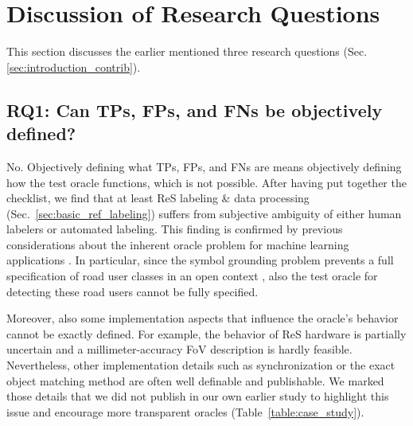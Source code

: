\documentclass[conference]{IEEEtran}
\begin{document}


\section{Discussion of Research Questions}
\label{sec:discussion}


This section discusses the earlier mentioned three research questions (Sec. \ref{sec:introduction_contrib}). 


\subsection{RQ1: Can TPs, FPs, and FNs be objectively defined?}
\label{sec:discussion_rq1}

No. Objectively defining what TPs, FPs, and FNs are means objectively defining how the test oracle functions, which is not possible. After having put together the checklist, we find that at least ReS labeling \& data processing (Sec.~\ref{sec:basic_ref_labeling}) suffers from subjective ambiguity of either human labelers or automated labeling. 
This finding is confirmed by previous considerations about the inherent oracle problem for machine learning applications \cite{Abrecht2021testing}. 
In particular, since the symbol grounding problem prevents a full specification of road user classes in an open context \cite{Salay2019partialspecifications, Abrecht2021testing}, also the test oracle for detecting these road users cannot be fully specified.

Moreover, also some implementation aspects that influence the oracle's behavior cannot be exactly defined.
For example, the behavior of ReS hardware is partially uncertain and a millimeter-accuracy FoV description is hardly feasible.
Nevertheless, other implementation details such as synchronization or the exact object matching method are often well definable and publishable.
We marked those details that we did not publish in our own earlier study to highlight this issue and encourage more transparent oracles (Table~\ref{table:case_study}). 
\end{document}
